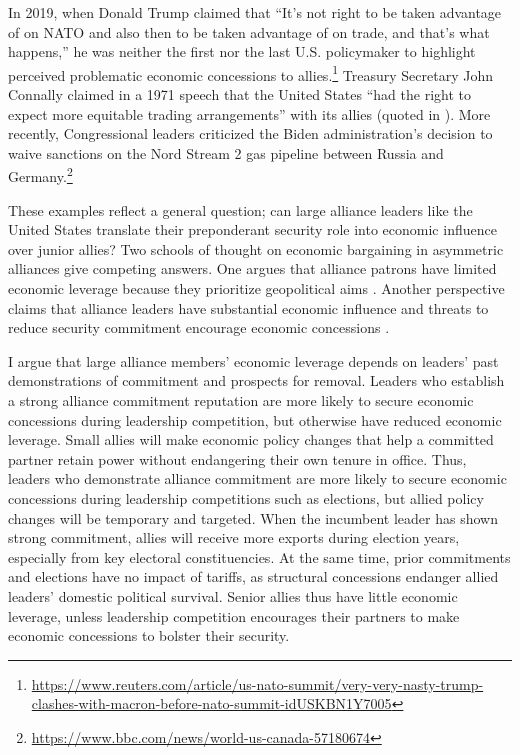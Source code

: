 \documentclass[12pt]{article}
\begin{document}
In 2019, when Donald Trump claimed that ``It's not right to be taken advantage of on NATO and also then to be taken advantage of on trade, and that's what happens,'' he was neither the first nor the last U.S. policymaker to highlight perceived problematic economic concessions to allies.\footnote{\url{https://www.reuters.com/article/us-nato-summit/very-very-nasty-trump-clashes-with-macron-before-nato-summit-idUSKBN1Y7005}}
Treasury Secretary John Connally claimed in a 1971 speech that the United States ``had the right to expect more equitable trading arrangements'' with its allies (quoted in \citet[pg 175]{Sayle2019}).
More recently, Congressional leaders criticized the Biden administration's decision to waive sanctions on the Nord Stream 2 gas pipeline between Russia and Germany.\footnote{\url{https://www.bbc.com/news/world-us-canada-57180674}}


These examples reflect a general question; can large alliance leaders like the United States translate their preponderant security role into economic influence over junior allies? 
Two schools of thought on economic bargaining in asymmetric alliances give competing answers. 
One argues that alliance patrons have limited economic leverage because they prioritize geopolitical aims \citep{Drezner2013, WolfordKim2017}.
Another perspective claims that alliance leaders have substantial economic influence \cite{Norrlof2010, Brooksetal2013} and threats to reduce security commitment encourage economic concessions \citep[pg. 122]{Oatley2015}. 


I argue that large alliance members' economic leverage depends on leaders' past demonstrations of commitment and prospects for removal.
Leaders who establish a strong alliance commitment reputation are more likely to secure economic concessions during leadership competition, but otherwise have reduced economic leverage.
Small allies will make economic policy changes that help a committed partner retain power without endangering their own tenure in office.  
Thus, leaders who demonstrate alliance commitment are more likely to secure economic concessions during leadership competitions such as elections, but allied policy changes will be temporary and targeted.
When the incumbent leader has shown strong commitment, allies will receive more exports during election years, especially from key electoral constituencies. 
At the same time, prior commitments and elections have no impact of tariffs, as structural concessions endanger allied leaders' domestic political survival. 
Senior allies thus have little economic leverage, unless leadership competition encourages their partners to make economic concessions to bolster their security. 
\end{document}
